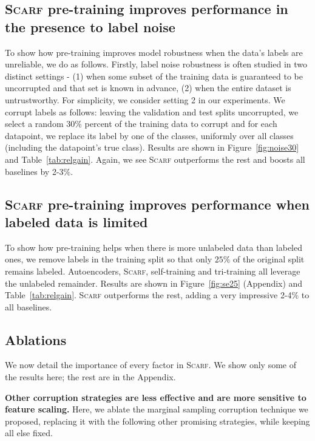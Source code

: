 \subsection{\textsc{Scarf} pre-training improves performance in the presence to label noise} To show how pre-training improves model robustness when the data's labels are unreliable, we do as follows. Firstly, label noise robustness is often studied in two distinct settings - (1) when some subset of the training data is guaranteed to be uncorrupted and that set is known in advance, (2) when the entire dataset is untrustworthy. For simplicity, we consider setting 2 in our experiments. We corrupt labels as follows: leaving the validation and test splits uncorrupted, we select a random 30\% percent of the training data to corrupt and for each datapoint, we replace its label by one of the classes, uniformly over all classes (including the datapoint's true class). Results are shown in Figure~\ref{fig:noise30} and Table~\ref{tab:relgain}. Again, we see \textsc{Scarf} outperforms the rest and boosts all baselines by 2-3\%.

\subsection{\textsc{Scarf} pre-training improves performance when labeled data is limited} To show how pre-training helps when there is more unlabeled data than labeled ones, we remove labels in the training split so that only $25\%$ of the original split remains labeled. Autoencoders, \textsc{Scarf}, self-training and tri-training all leverage the unlabeled remainder. Results are shown in Figure~\ref{fig:se25} (Appendix) and Table~\ref{tab:relgain}. \textsc{Scarf} outperforms the rest, adding a very impressive 2-4\% to all baselines.

\subsection{Ablations}
We now detail the importance of every factor in \textsc{Scarf}. We show only some of the results here; the rest are in the Appendix.

{\bf Other corruption strategies are less effective and are more sensitive to feature scaling.} Here, we ablate the marginal sampling corruption technique we proposed, replacing it with the following other promising strategies, while keeping all else fixed.

